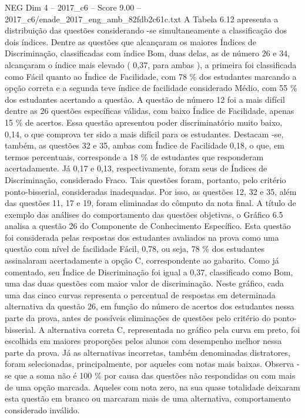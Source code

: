 \begin{textsample}{NEG Dim 4 – 2017\_c6 – Score 9.00 – 2017\_c6/enade\_2017\_eng\_amb\_82fdb2c61c.txt}
A Tabela 6.12 apresenta a distribuição das questões considerando -se simultaneamente a classificação dos dois índices.
Dentre as questões que alcançaram os maiores Índices de Discriminação, classificadas com índice Bom, duas delas, as de número 26 e 34, alcançaram o índice mais elevado ( 0,37, para ambas ), a primeira foi classificada como Fácil quanto ao Índice de Facilidade, com 78 \% dos estudantes marcando a opção correta e a segunda teve índice de facilidade considerado Médio, com 55 \% dos estudantes acertando a questão.
A questão de número 12 foi a mais difícil dentre as 26 questões específicas válidas, com baixo Índice de Facilidade, apenas 15 \% de acertos.
Essa questão apresentou poder discriminatório muito baixo, 0,14, o que comprova ter sido a mais difícil para os estudantes.
Destacam -se, também, as questões 32 e 35, ambas com Índice de Facilidade 0,18, o que, em termos percentuais, corresponde a 18 \% de estudantes que responderam acertadamente.
Já 0,17 e 0,13, respectivamente, foram seus de Índices de Discriminação, considerado Fraco.
Tais questões foram, portanto, pelo critério ponto-bisserial, consideradas inadequadas.
Por isso, as questões 12, 32 e 35, além das questões 11, 17 e 19, foram eliminadas do cômputo da nota final.
A título de exemplo das análises do comportamento das questões objetivas, o Gráfico 6.5 analisa a questão 26 do Componente de Conhecimento Específico.
Esta questão foi considerada pelas respostas dos estudantes avaliados na prova como uma questão com nível de facilidade Fácil, 0,78, ou seja, 78 \% dos estudantes assinalaram acertadamente a opção C, correspondente ao gabarito.
Como já comentado, seu Índice de Discriminação foi igual a 0,37, classificado como Bom, uma das duas questões com maior valor de discriminação.
Neste gráfico, cada uma das cinco curvas representa o percentual de respostas em determinada alternativa da questão 26, em função do número de acertos dos estudantes nessa parte da prova, antes de possíveis eliminações de questões pelo critério do ponto-bisserial.
A alternativa correta C, representada no gráfico pela curva em preto, foi escolhida em maiores proporções pelos alunos com desempenho melhor nessa parte da prova.
Já as alternativas incorretas, também denominadas distratores, foram selecionadas, principalmente, por aqueles com notas mais baixas.
Observa -se que a soma não é 100 \% por causa das questões não respondidas ou com mais de uma opção marcada.
Aqueles com nota zero, na sua quase totalidade deixaram esta questão em branco ou marcaram mais de uma alternativa, comportamento considerado inválido.

\end{textsample}
